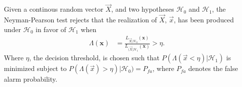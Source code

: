 \documentclass[a4paper, openany, oneside]{memoir}
\begin{document}
\begin{blockDefinition}
Given a continous random vector $\vec{X}$, and two hypotheses $\mathcal{H}_0$ and $\mathcal{H}_1$, the Neyman-Pearson test rejects that the realization of $\vec{X}$, $\vec{x}$, has been produced under $\mathcal{H}_0$ in favor of $\mathcal{H}_1$
when
\begin{align*}
    \Lambda (\mathbf{x}) &= \frac{L_{\vec{X} | \mathcal{H}_0} (\mathbf{x})}{L_{(\vec{X} | \mathcal{H}_1}(\mathbf{x})} > \eta. 
\end{align*}
Where $\eta$, the decision threshold, is chosen such that $P(\Lambda(\vec{x} < \eta) | \mathcal{H}_1)$ is minimized subject to $P(\Lambda(\vec{x}) > \eta) | \mathcal{H}_0) = P_{fa}$, where $P_{fa}$ denotes the false alarm probability. %
\end{blockDefinition}
\end{document}
